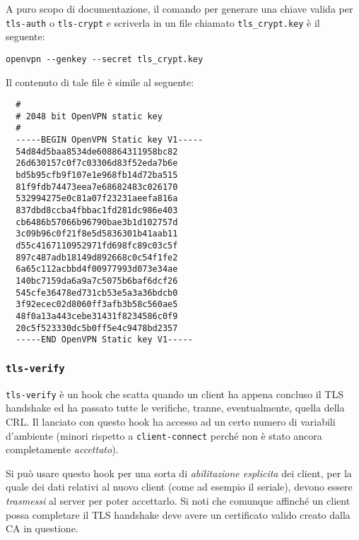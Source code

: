A puro scopo di documentazione, il comando per generare una chiave valida per
\texttt{tls-auth} o \texttt{tls-crypt} e scriverla in un file chiamato \texttt{tls\_crypt.key}
è il seguente:
\begin{verbatim}
openvpn --genkey --secret tls_crypt.key
\end{verbatim}
Il contenuto di tale file è simile al seguente:
\begin{verbatim}
  #
  # 2048 bit OpenVPN static key
  #
  -----BEGIN OpenVPN Static key V1-----
  54d84d5baa8534de608864311958bc82
  26d630157c0f7c03306d83f52eda7b6e
  bd5b95cfb9f107e1e968fb14d72ba515
  81f9fdb74473eea7e68682483c026170
  532994275e0c81a07f23231aeefa816a
  837dbd8ccba4fbbac1fd281dc986e403
  cb6486b57066b96790bae3b1d102757d
  3c09b96c0f21f8e5d5836301b41aab11
  d55c4167110952971fd698fc89c03c5f
  897c487adb18149d892668c0c54f1fe2
  6a65c112acbbd4f00977993d073e34ae
  140bc7159da6a9a7c5075b6baf6dcf26
  545cfe36478ed731cb53e5a3a36bdcb0
  3f92ecec02d8060ff3afb3b58c560ae5
  48f0a13a443cebe31431f8234586c0f9
  20c5f523330dc5b0ff5e4c9478bd2357
  -----END OpenVPN Static key V1-----
\end{verbatim}


\subsubsection{\texttt{tls-verify}}
\texttt{tls-verify} è un hook che scatta quando un client ha appena concluso il TLS
handshake ed ha passato tutte le verifiche, tranne, eventualmente, quella della CRL.
Il lanciato con questo hook ha accesso ad un certo numero di variabili d'ambiente
(minori rispetto a \texttt{client-connect} perché non è stato ancora completamente
\textit{accettato}). 

Si può usare questo hook per una sorta di \textit{abilitazione esplicita} dei client,
per la quale dei dati relativi al nuovo client (come ad esempio il seriale), devono
essere \textit{trasmessi} al server per poter accettarlo.
Si noti che comunque
affinché un client possa completare il TLS handshake deve avere un certificato valido
creato dalla CA in questione.

